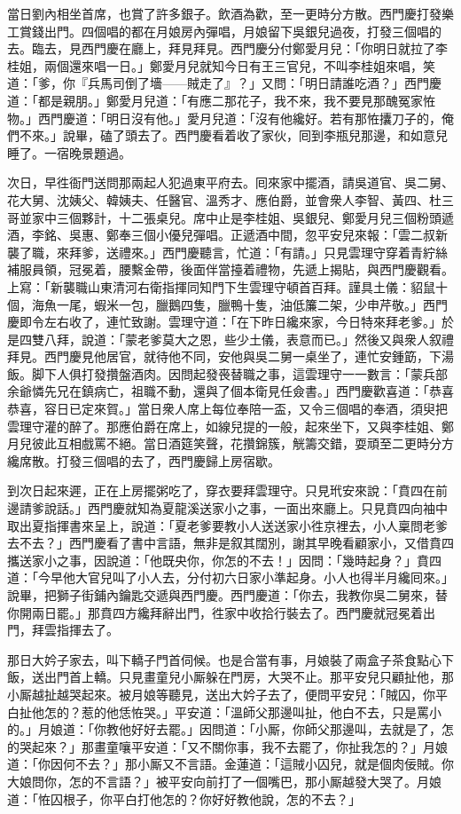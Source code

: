 當日劉內相坐首席，也賞了許多銀子。飲酒為歡，至一更時分方散。西門慶打發樂工賞錢出門。四個唱的都在月娘房內彈唱，月娘留下吳銀兒過夜，打發三個唱的去。臨去，見西門慶在廳上，拜見拜見。西門慶分付鄭愛月兒：「你明日就拉了李桂姐，兩個還來唱一日。」鄭愛月兒就知今日有王三官兒，不叫李桂姐來唱，{}笑道：「爹，你『兵馬司倒了墻——賊走了』？」又問：「明日請誰吃酒？」西門慶道：「都是親朋。」鄭愛月兒道：「有應二那花子，我不來，我不要見那醜冤家恠物。」西門慶道：「明日沒有他。」愛月兒道：「沒有他纔好。若有那恠攮刀子的，俺們不來。」說畢，磕了頭去了。西門慶看着收了家伙，囘到李瓶兒那邊，和如意兒睡了。一宿晚景題過。

次日，早徃衙門送問那兩起人犯過東平府去。囘來家中擺酒，請吳道官、吳二舅、花大舅、沈姨父、韓姨夫、任醫官、溫秀才、應伯爵，並會衆人李智、黃四、杜三哥並家中三個夥計，十二張桌兒。席中止是李桂姐、吳銀兒、鄭愛月兒三個粉頭遞酒，李銘、吳惠、鄭奉三個小優兒彈唱。正遞酒中間，忽平安兒來報：「雲二叔新襲了職，來拜爹，送禮來。」西門慶聽言，忙道：「有請。」只見雲理守穿着青紵絲補服員領，冠冕着，腰繫金帶，後面伴當擡着禮物，先遞上揭貼，與西門慶觀看。上寫：「新襲職山東清河右衛指揮同知門下生雲理守頓首百拜。謹具土儀：貂鼠十個，海魚一尾，蝦米一包，臘鵝四隻，臘鴨十隻，油低簾二架，少申芹敬。」西門慶即令左右收了，連忙致謝。雲理守道：「在下昨日纔來家，今日特來拜老爹。」於是四雙八拜，說道：「蒙老爹莫大之恩，些少土儀，表意而已。」然後又與衆人叙禮拜見。西門慶見他居官，就待他不同，安他與吳二舅一桌坐了，連忙安鍾筯，下湯飯。脚下人俱打發攢盤酒肉。因問起發䘮替職之事，這雲理守一一數言：「蒙兵部余爺憐先兄在鎮病亡，祖職不動，還與了個本衛見任僉書。」西門慶歡喜道：「恭喜恭喜，容日已定來賀。」當日衆人席上每位奉陪一盃，又令三個唱的奉酒，須臾把雲理守灌的醉了。那應伯爵在席上，如線兒提的一般，起來坐下，又與李桂姐、鄭月兒彼此互相戲罵不絕。當日酒筵笑聲，花攢錦簇，觥籌交錯，耍頑至二更時分方纔席散。打發三個唱的去了，西門慶歸上房宿歇。

到次日起來遲，正在上房擺粥吃了，穿衣要拜雲理守。只見玳安來說：「賁四在前邊請爹說話。」西門慶就知為夏龍溪送家小之事，一面出來廳上。只見賁四向袖中取出夏指揮書來呈上，說道：「夏老爹要教小人送送家小徃京裡去，小人稟問老爹去不去？」西門慶看了書中言語，無非是叙其闊別，謝其早晚看顧家小，又借賁四攜送家小之事，因說道：「他既央你，你怎的不去！」因問：「幾時起身？」賁四道：「今早他大官兒叫了小人去，分付初六日家小準起身。小人也得半月纔囘來。」說畢，把獅子街鋪內鑰匙交遞與西門慶。西門慶道：「你去，我教你吳二舅來，替你開兩日罷。」那賁四方纔拜辭出門，徃家中收拾行裝去了。西門慶就冠冕着出門，拜雲指揮去了。

那日大妗子家去，叫下轎子門首伺候。也是合當有事，月娘裝了兩盒子茶食點心下飯，送出門首上轎。只見畫童兒小厮躲在門房，大哭不止。那平安兒只顧扯他，那小厮越扯越哭起來。{}{}被月娘等聽見，送出大妗子去了，便問平安兒：「賊囚，你平白扯他怎的？惹的他恁恠哭。」平安道：「溫師父那邊叫扯，他白不去，只是罵小的。」月娘道：「你教他好好去罷。」因問道：「小厮，你師父那邊叫，去就是了，怎的哭起來？」那畫童嚷平安道：「又不關你事，我不去罷了，你扯我怎的？」月娘道：「你因何不去？」那小厮又不言語。金蓮道：「這賊小囚兒，就是個肉佞賊。你大娘問你，怎的不言語？」被平安向前打了一個嘴巴，{}那小厮越發大哭了。月娘道：「恠囚根子，你平白打他怎的？你好好教他說，怎的不去？」


